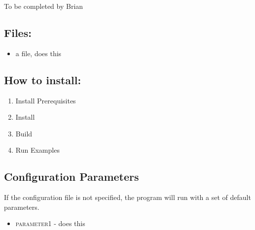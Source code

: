 To be completed by Brian

\subsection{Files:}

\begin{itemize}
\item{a file, does this}
\end{itemize}


\subsection{How to install:}
\begin{enumerate}
	\item{Install Prerequisites} 
	\item{Install } 
	\item{Build } 
	\item{Run Examples} 
\end{enumerate}

\subsection{Configuration Parameters}
If the configuration file is not specified, the program will run with a set of default parameters.
\begin{itemize}
	\item{\textsc{parameter1 }} - does this

\end{itemize}



